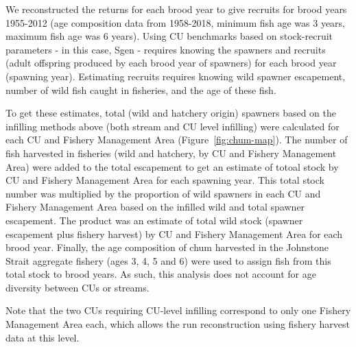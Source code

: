 \documentclass[11pt]{book}
\begin{document}
We reconstructed the returns for each brood year to give recruits for brood years 1955-2012 (age composition data from 1958-2018, minimum fish age was 3 years, maximum fish age was 6 years). Using CU benchmarks based on stock-recruit parameters - in this case, Sgen - requires knowing the spawners and recruits (adult offspring produced by each brood year of spawners) for each brood year (spawning year). Estimating recruits requires knowing wild spawner escapement, number of wild fish caught in fisheries, and the age of these fish.

To get these estimates, total (wild and hatchery origin) spawners based on the infilling methods above (both stream and CU level infilling) were calculated for each CU and Fishery Management Area (Figure~\ref{fig:chum-map}). The number of fish harvested in fisheries (wild and hatchery, by CU and Fishery Management Area) were added to the total escapement to get an estimate of totoal stock by CU and Fishery Management Area for each spawning year. This total stock number was multiplied by the proportion of wild spawners in each CU and Fishery Management Area based on the infilled wild and total spawner escapement. The product was an estimate of total wild stock (spawner escapement plus fishery harvest) by CU and Fishery Management Area for each brood year. Finally, the age composition of chum harvested in the Johnstone Strait aggregate fishery (ages 3, 4, 5 and 6) were used to assign fish from this total stock to brood years. As such, this analysis does not account for age diversity between CUs or streams.

Note that the two CUs requiring CU-level infilling correspond to only one Fishery Management Area each, which allows the run reconstruction using fishery harvest data at this level.


\clearpage

\label{app:samsim-appendix}
\end{document}
